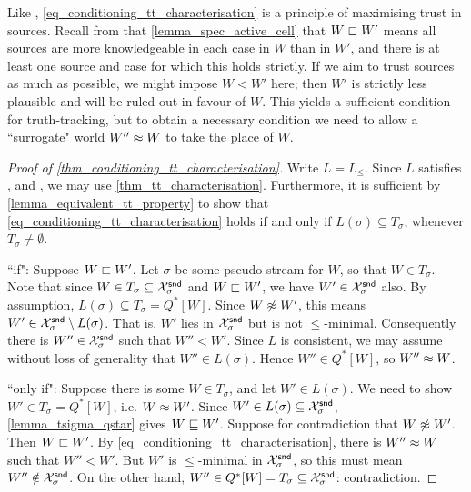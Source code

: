 Like \credulity{}, \cref{eq_conditioning_tt_characterisation} is a principle of
maximising trust in sources. Recall from that \cref{lemma_spec_active_cell}
that $W \sqsubset W'$ means all sources are more knowledgeable in each case in
$W$ than in $W'$, and there is at least one source and case for which this
holds strictly. If we aim to trust sources as much as possible, we might impose
$W < W'$ here; then $W'$ is strictly less plausible and will be ruled out in
favour of $W$.  This yields a sufficient condition for truth-tracking, but to
obtain a necessary condition we need to allow a ``surrogate" world $W'' \approx
W$ to take the place of $W$.

\begin{proof}[Proof of \cref{thm_conditioning_tt_characterisation}]
    Write $L = L_{\le}$. Since $L$ satisfies \equivalence{}, \repetition{} and
    \soundness{}, we may use \cref{thm_tt_characterisation}. Furthermore, it is
    sufficient by \cref{lemma_equivalent_tt_property} to show that
    \cref{eq_conditioning_tt_characterisation} holds if and only if $L(\sigma)
    \subseteq T_\sigma$, whenever $T_\sigma \ne \emptyset$.

    ``if": Suppose $W \sqsubset W'$. Let $\sigma$ be some pseudo-stream for $W$,
    so that $W \in T_\sigma$.\footnotemark{} Note that since $W \in T_\sigma
    \subseteq \mathcal{X}^\mathsf{snd}_\sigma$ and $W \sqsubset W'$, we have $W' \in \mathcal{X}^\mathsf{snd}_\sigma$
    also. By assumption, $L(\sigma) \subseteq T_\sigma = Q^*[W]$. Since $W
    \not\approx W'$, this means $W' \in \mathcal{X}^\mathsf{snd}_\sigma \setminus L(\sigma)$. That
    is, $W'$ lies in $\mathcal{X}^\mathsf{snd}_\sigma$ but is not $\le$-minimal. Consequently
    there is $W'' \in \mathcal{X}^\mathsf{snd}_\sigma$ such that $W'' < W'$. Since $L$ is
    consistent, we may assume without loss of generality that $W'' \in
    L(\sigma)$. Hence $W'' \in Q^*[W]$, so $W'' \approx W$.


    ``only if": Suppose there is some $W \in T_\sigma$, and let $W' \in
    L(\sigma)$. We need to show $W' \in T_\sigma = Q^*[W]$, i.e. $W \approx
    W'$. Since $W' \in L(\sigma) \subseteq \mathcal{X}^\mathsf{snd}_\sigma$,
    \cref{lemma_tsigma_qstar} gives $W \sqsubseteq W'$. Suppose for contradiction
    that $W \not\approx W'$. Then $W \sqsubset W'$. By
    \cref{eq_conditioning_tt_characterisation}, there is $W'' \approx W$ such
    that $W'' < W'$. But $W'$ is $\le$-minimal in $\mathcal{X}^\mathsf{snd}_\sigma$, so this must
    mean $W'' \notin \mathcal{X}^\mathsf{snd}_\sigma$. On the other hand, $W'' \in Q^*[W] =
    T_\sigma \subseteq \mathcal{X}^\mathsf{snd}_\sigma$: contradiction.
\end{proof}


